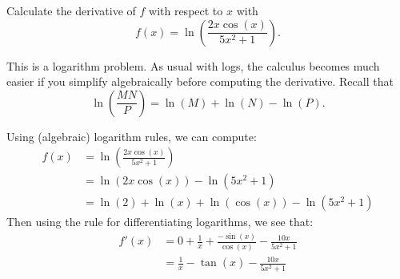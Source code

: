 \documentclass{ximera}
\author{Emma Smith Zbarsky}
\begin{document}
\begin{exercise}

Calculate the derivative of $f$ with respect to $x$ with
\[f(x) = \ln\left(\frac{2x\cos(x)}{5x^2+1}\right).\]


\begin{hint}
This is a logarithm problem. As usual with logs, the calculus becomes
much easier if you simplify algebraically before computing the
derivative. Recall that
\[\ln\left(\frac{MN}{P}\right) = \ln(M)+\ln(N)-\ln(P).\]
\end{hint}


\begin{hint}
Using (algebraic) logarithm rules, we can compute: \begin{align*}
f(x) &= \ln\left(\frac{2x\cos(x)}{5x^2+1}\right) \\
&= \ln(2x\cos(x))-\ln(5x^2+1) \\
&= \ln(2)+\ln(x)+\ln(\cos(x))-\ln(5x^2+1)
\end{align*} Then using the rule for differentiating logarithms, we
see that: \begin{align*}
f'(x) &= 
0 + \frac{1}{x} + \frac{-\sin(x)}{\cos(x)} - \frac{10x}{5x^2+1} \\
&= \frac{1}{x} -\tan(x) - \frac{10x}{5x^2+1}
\end{align*}
\end{hint}


\begin{multipleChoice}
\end{multipleChoice}

\end{exercise}
\end{document}
